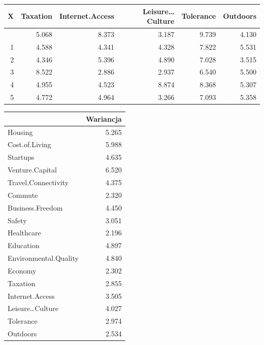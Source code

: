 \documentclass[
  12pt,
]{article}
\begin{document}
\begin{longtable}[]{@{}rrrrrr@{}}
\toprule\noalign{}
X & Taxation & Internet.Access & Leisure\ldots Culture & Tolerance &
Outdoors \\
\midrule\noalign{}
\endhead
\bottomrule\noalign{}
\endlastfoot
0 & 5.068 & 8.373 & 3.187 & 9.739 & 4.130 \\
1 & 4.588 & 4.341 & 4.328 & 7.822 & 5.531 \\
2 & 4.346 & 5.396 & 4.890 & 7.028 & 3.515 \\
3 & 8.522 & 2.886 & 2.937 & 6.540 & 5.500 \\
4 & 4.955 & 4.523 & 8.874 & 8.368 & 5.307 \\
5 & 4.772 & 4.964 & 3.266 & 7.093 & 5.358 \\
\end{longtable}

\begin{longtable}[]{@{}lr@{}}
\toprule\noalign{}
& Wariancja \\
\midrule\noalign{}
\endhead
\bottomrule\noalign{}
\endlastfoot
Housing & 5.265 \\
Cost.of.Living & 5.988 \\
Startups & 4.635 \\
Venture.Capital & 6.520 \\
Travel.Connectivity & 4.375 \\
Commute & 2.320 \\
Business.Freedom & 4.450 \\
Safety & 3.051 \\
Healthcare & 2.196 \\
Education & 4.897 \\
Environmental.Quality & 4.840 \\
Economy & 2.302 \\
Taxation & 2.855 \\
Internet.Access & 3.505 \\
Leisure\ldots Culture & 4.027 \\
Tolerance & 2.974 \\
Outdoors & 2.534 \\
\end{longtable}
\end{document}
